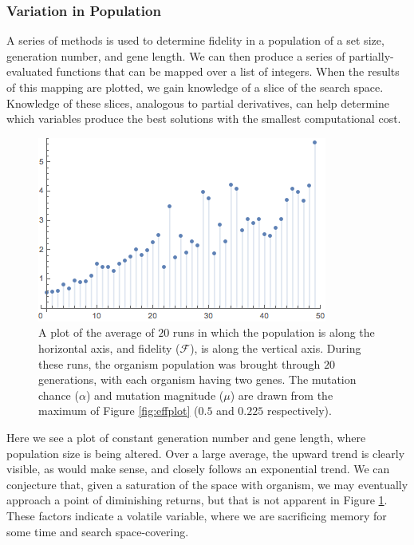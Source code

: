 \documentclass[11pt,twocolumn]{article}
\begin{document}

	\subsubsection{Variation in Population}

	A series of methods is used to determine fidelity in a population of a set size, generation number, and gene length. We can then produce a series of partially-evaluated functions that can be mapped over a list of integers. When the results of this mapping are plotted, we gain knowledge of a slice of the search space. Knowledge of these slices, analogous to partial derivatives, can help determine which variables produce the best solutions with the smallest computational cost. 

	\begin{figure}[htpb]
		\centering
			\includegraphics[scale=0.6]{20G_Plot_2.png}
		\centering
		\caption{A plot of the average of $20$ runs in which the population is along the horizontal axis, and fidelity ($\mathcal{F}$), is along the vertical axis. During these runs, the organism population was brought through $20$ generations, with each organism having two genes. The mutation chance ($\alpha$) and mutation magnitude ($\mu$) are drawn from the maximum of Figure \ref{fig:effplot} ($0.5$ and $0.225$ respectively).}
		\label{fig:pop_plot}
	\end{figure}

	Here we see a plot of constant generation number and gene length, where population size is being altered. Over a large average, the upward trend is clearly visible, as would make sense, and closely follows an exponential trend. We can conjecture that, given a saturation of the space with organism, we may eventually approach a point of diminishing returns, but that is not apparent in Figure \ref{fig:pop_plot}. These factors indicate a volatile variable, where we are sacrificing memory for some time and search space-covering. 
\end{document}
